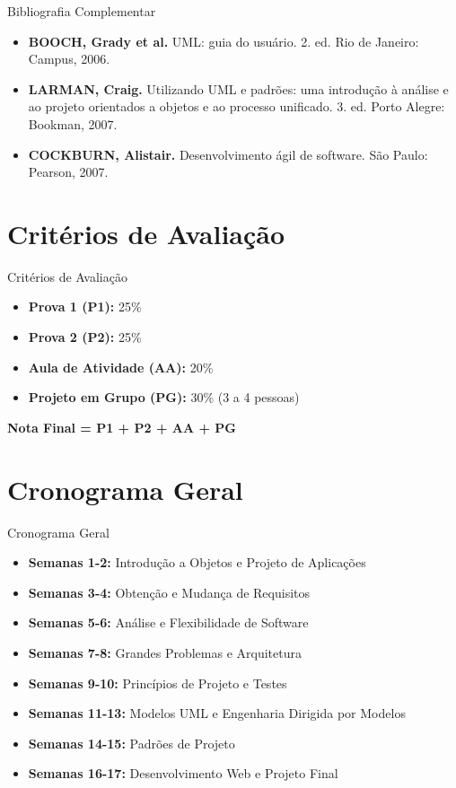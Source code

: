 \documentclass[aspectratio=169]{beamer}
\begin{document}
\begin{frame}{Bibliografia Complementar}
\begin{itemize}
    \item \textbf{BOOCH, Grady et al.} UML: guia do usuário. 2. ed. Rio de Janeiro: Campus, 2006.
    \item \textbf{LARMAN, Craig.} Utilizando UML e padrões: uma introdução à análise e ao projeto orientados a objetos e ao processo unificado. 3. ed. Porto Alegre: Bookman, 2007.
    \item \textbf{COCKBURN, Alistair.} Desenvolvimento ágil de software. São Paulo: Pearson, 2007.
\end{itemize}
\end{frame}

\section{Critérios de Avaliação}

\begin{frame}{Critérios de Avaliação}
\begin{itemize}
    \item \textbf{Prova 1 (P1):} 25\%
    \item \textbf{Prova 2 (P2):} 25\%
    \item \textbf{Aula de Atividade (AA):} 20\%
    \item \textbf{Projeto em Grupo (PG):} 30\% (3 a 4 pessoas)
\end{itemize}

\vspace{0.5cm}
\textbf{Nota Final = P1 + P2 + AA + PG}
\end{frame}

\section{Cronograma Geral}

\begin{frame}{Cronograma Geral}
\begin{itemize}
    \item \textbf{Semanas 1-2:} Introdução a Objetos e Projeto de Aplicações
    \item \textbf{Semanas 3-4:} Obtenção e Mudança de Requisitos
    \item \textbf{Semanas 5-6:} Análise e Flexibilidade de Software
    \item \textbf{Semanas 7-8:} Grandes Problemas e Arquitetura
    \item \textbf{Semanas 9-10:} Princípios de Projeto e Testes
    \item \textbf{Semanas 11-13:} Modelos UML e Engenharia Dirigida por Modelos
    \item \textbf{Semanas 14-15:} Padrões de Projeto
    \item \textbf{Semanas 16-17:} Desenvolvimento Web e Projeto Final
\end{itemize}
\end{frame}
\end{document}
